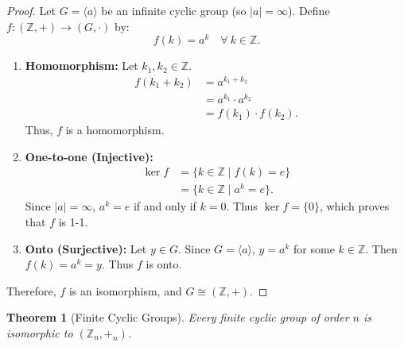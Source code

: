 \documentclass[12pt]{article}
\theoremstyle{definition}
\theoremstyle{plain}
\newtheorem{theorem}{Theorem}[section]
\begin{document}
\begin{proof}
Let $G = \langle a \rangle$ be an infinite cyclic group (so $|a| = \infty$).
Define $f: (\mathbb{Z}, +) \longrightarrow (G, \cdot)$ by:
\[
f(k) = a^k \quad \forall\ k \in \mathbb{Z}.
\]
\begin{enumerate}
    \item \textbf{Homomorphism:}
    Let $k_1, k_2 \in \mathbb{Z}$.
    \begin{align*}
        f(k_1 + k_2) &= a^{k_1 + k_2} \\
        &= a^{k_1} \cdot a^{k_2} \\
        &= f(k_1) \cdot f(k_2).
    \end{align*}
    Thus, $f$ is a homomorphism.

    \item \textbf{One-to-one (Injective):}
    \begin{align*}
        \ker f &= \{k \in \mathbb{Z} \mid f(k) = e\} \\
        &= \{k \in \mathbb{Z} \mid a^k = e\}.
    \end{align*}
    Since $|a| = \infty$, $a^k = e$ if and only if $k = 0$.
    Thus $\ker f = \{0\}$, which proves that $f$ is 1-1.

    \item \textbf{Onto (Surjective):}
    Let $y \in G$. Since $G = \langle a \rangle$, $y = a^k$ for some $k \in \mathbb{Z}$.
    Then $f(k) = a^k = y$.
    Thus $f$ is onto.
\end{enumerate}
Therefore, $f$ is an isomorphism, and $\boxed{G \cong (\mathbb{Z}, +)}$.
\end{proof}

\begin{theorem}[Finite Cyclic Groups]
Every finite cyclic group of order $n$ is isomorphic to $(\mathbb{Z}_n, +_n)$.
\end{theorem}
\end{document}
